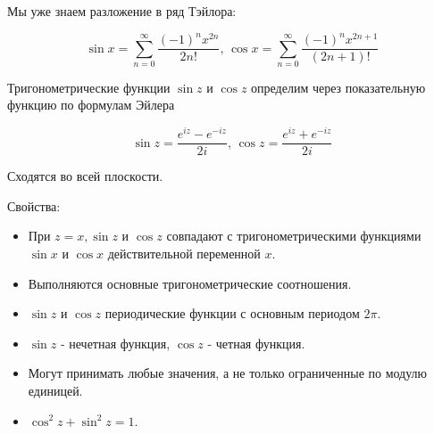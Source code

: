 \begin{theorem}  \thmslashn

    Мы уже знаем разложение в ряд Тэйлора:
    
    \[\sin{x}=\sum_{n=0}^{\infty} \frac{(-1)^{n}x^{2n}}{2n!} \text{,  } \cos{x}=\sum_{n=0}^{\infty} \frac{(-1)^{n}x^{2n+1}}{(2n+1)!}\]
    
	Тригонометрические функции $\sin{z}$ и $\cos{z}$ определим через показательную функцию по формулам Эйлера
	
	\[\sin{z}=\frac{e^{iz} - e^{-iz}}{2i} \text{,   } \cos{z}=\frac{e^{iz} + e^{-iz}}{2i}\]
    
    Сходятся во всей плоскости.
    
    Свойства:
    
    \begin{itemize}
        \item
        
            При $z = x, \sin{z} \text{ и } \cos{z}$ совпадают с тригонометрическими функциями $\sin{x} \text{ и } \cos{x}$ действительной переменной $x$.
            
        \item
        
            Выполняются основные тригонометрические соотношения.
            
        \item
            
            $\sin{z} \text{ и } \cos{z}$ периодические функции с основным периодом $2\pi$.
            
        \item
            
            $\sin{z}$ - нечетная функция, $\cos{z}$ - четная функция.
                
        \item
                
            Могут принимать любые значения, а не только ограниченные по модулю единицей.
                
        \item
        
            $\cos^{2}z + \sin^{2}z = 1$.
            
    \end{itemize}
    
\end{theorem}

